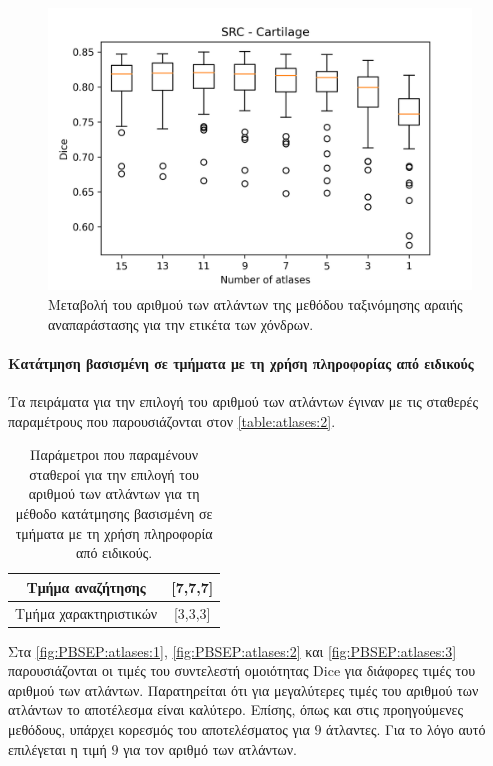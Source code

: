 \documentclass[a4paper,12pt]{article}
\newcommand{\paragraphLine}[1]{\paragraph{#1}\mbox{}}
\begin{document}
\begin{figure}[H]
    \centering
    \includegraphics[width=0.85\linewidth]{SRC_Number_of_atlases_Cartilage_plot.png}
    \caption{Μεταβολή του αριθμού των ατλάντων της μεθόδου ταξινόμησης αραιής
             αναπαράστασης για την ετικέτα των χόνδρων.}
    \label{fig:SRC:atlases:3}
\end{figure}

\paragraphLine{Κατάτμηση βασισμένη σε τμήματα με τη χρήση πληροφορίας από
               ειδικούς}

Τα πειράματα για την επιλογή του αριθμού των ατλάντων έγιναν με τις σταθερές
παραμέτρους που παρουσιάζονται στον \autoref{table:atlases:2}.

\begin{table}[h!]
    \centering
    \begin{tabular}{|c|c|} 
        \hline
        Τμήμα αναζήτησης & [7,7,7] \\ 
        \hline
        Τμήμα χαρακτηριστικών & [3,3,3] \\ 
        \hline
    \end{tabular}
    \caption{Παράμετροι που παραμένουν σταθεροί για την επιλογή του αριθμού των
             ατλάντων για τη μέθοδο κατάτμησης βασισμένη σε τμήματα με τη χρήση
             πληροφορία από ειδικούς.}
    \label{table:atlases:2}
\end{table}

Στα \autoref{fig:PBSEP:atlases:1}, \autoref{fig:PBSEP:atlases:2} και
\autoref{fig:PBSEP:atlases:3} παρουσιάζονται οι τιμές του συντελεστή ομοιότητας
Dice για διάφορες τιμές του αριθμού των ατλάντων. Παρατηρείται ότι για
μεγαλύτερες τιμές του αριθμού των ατλάντων το αποτέλεσμα είναι καλύτερο. Επίσης,
όπως και στις προηγούμενες μεθόδους, υπάρχει κορεσμός του αποτελέσματος για $9$
άτλαντες. Για το λόγο αυτό επιλέγεται η τιμή $9$ για τον αριθμό των ατλάντων.
\end{document}
